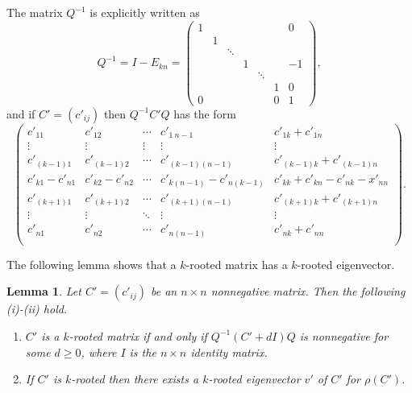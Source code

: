 \documentclass[12pt, a4paper]{article}
\theoremstyle{plain}
\newtheorem{lem}[thm]{Lemma}
\theoremstyle{definition}
\begin{document}
The matrix $Q^{-1}$ is explicitly written as
    $$Q^{-1}=I-E_{kn}=
\begin{pmatrix}
1 &   &        &       &        &   & 0 \\
  & 1 &        &       &        &   &   \\
  &   & \ddots &       &        &   &   \\
  &   &        & 1     &        &   & -1 \\
  &   &        &       &\ddots  &   &  \\
  &   &        &       &        &1  & 0 \\
0 &   &        &       &        &0  & 1
\end{pmatrix},$$ 
and if $C'=(c'_{ij})$ then $Q^{-1}C'Q$ has the form 
\begin{equation}\label{e6}
\begin{pmatrix}
            c'_{11}     & c'_{12} & \cdots     & c'_{1\ n-1} & c'_{1k}+c'_{1n} \\
            \vdots      & \vdots  & \vdots     & \vdots      & \vdots\\
            c'_{(k-1) 1}   & c'_{(k-1)  2}           & \cdots     & c'_{(k-1) (n-1)} & c'_{(k-1) k}+c'_{(k-1) n} \\
            c'_{k1}-c'_{n1} & c'_{k2}-c'_{n2} &\cdots      &c'_{k (n-1)}-c'_{n (k-1)}& c'_{kk}+c'_{kn}-c'_{nk}-x'_{nn}\\
            c'_{(k+1) 1}   & c'_{(k+1) 2}           & \cdots     & c'_{(k+1) (n-1)} & c'_{(k+1) k}+c'_{(k+1)
             n} \\
            \vdots              & \vdots & \ddots              & \vdots & \vdots \\
            c'_{n1}     & c'_{n2} & \cdots             & c'_{n (n-1)} & c'_{nk}+c'_{nn} \\
        \end{pmatrix}.\end{equation}


The following lemma shows that a $k$-rooted matrix has a $k$-rooted eigenvector.


\begin{lem}\label{lma_m_rooted}
    Let $C'=(c'_{ij})$ be an $n\times n$ nonnegative matrix. Then the following (i)-(ii) hold.
        \begin{enumerate}[label=(\roman*)]
            \item \label{lma_m_rooted_cond1} $C'$ is a $k$-rooted matrix if and only if $Q^{-1}(C'+dI)Q$ is nonnegative for some $d\geq 0$, where $I$ is the $n\times n$ identity matrix. 
            \item \label{lma_m_rooted_cond2} If $C'$ is $k$-rooted then there exists a  $k$-rooted eigenvector $v'$ of $C'$  for $\rho(C')$.
        \end{enumerate}
\end{lem}
\end{document}
